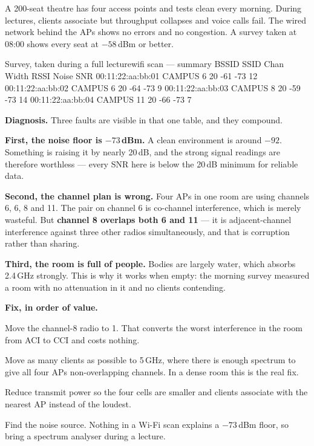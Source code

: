 \begin{breakfix}
A 200-seat theatre has four access points and tests clean every morning. During
lectures, clients associate but throughput collapses and voice calls fail. The
wired network behind the APs shows no errors and no congestion. A survey taken at
08:00 shows every seat at $-58$\,dBm or better.

\begin{hostcmd}{Survey, taken during a full lecture}{wifi scan --- summary}
BSSID              SSID        Chan  Width  RSSI    Noise   SNR
00:11:22:aa:bb:01  CAMPUS      6     20     -61     -73      12
00:11:22:aa:bb:02  CAMPUS      6     20     -64     -73       9
00:11:22:aa:bb:03  CAMPUS      8     20     -59     -73      14
00:11:22:aa:bb:04  CAMPUS      11    20     -66     -73       7
\end{hostcmd}

\textbf{Diagnosis.} Three faults are visible in that one table, and they compound.

\textbf{First, the noise floor is $-73$\,dBm.} A clean environment is around
$-92$. Something is raising it by nearly 20\,dB, and the strong signal readings
are therefore worthless --- every SNR here is below the 20\,dB minimum for
reliable data.

\textbf{Second, the channel plan is wrong.} Four APs in one room are using
channels 6, 6, 8 and 11. The pair on channel 6 is co-channel interference, which
is merely wasteful. But \textbf{channel 8 overlaps both 6 and 11} --- it is
adjacent-channel interference against three other radios simultaneously, and that
is corruption rather than sharing.

\textbf{Third, the room is full of people.} Bodies are largely water, which
absorbs 2.4\,GHz strongly. This is why it works when empty: the morning survey
measured a room with no attenuation in it and no clients contending.

\textbf{Fix, in order of value.}

\begin{tight}
  \item Move the channel-8 radio to 1. That converts the worst interference in
        the room from ACI to CCI and costs nothing.
  \item Move as many clients as possible to 5\,GHz, where there is enough
        spectrum to give all four APs non-overlapping channels. In a dense room
        this is the real fix.
  \item Reduce transmit power so the four cells are smaller and clients associate
        with the nearest AP instead of the loudest.
  \item Find the noise source. Nothing in a Wi-Fi scan explains a $-73$\,dBm
        floor, so bring a spectrum analyser during a lecture.
\end{tight}


\end{breakfix}
